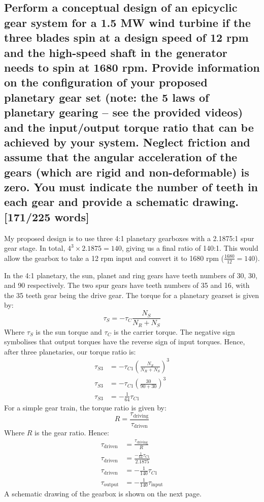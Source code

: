 \documentclass[12pt]{article}
\numberwithin{equation}{section}
\begin{document}
\begin{flushleft}
\subsection[Schematic.]{Perform a conceptual design of an epicyclic gear system for a 1.5 MW wind turbine if the three blades spin at a design speed of 12 rpm and the high-speed shaft in the generator needs to spin at 1680 rpm. Provide information on the configuration of your proposed planetary gear set (note: the 5 laws of planetary gearing – see the provided videos) and the input/output torque ratio that can be achieved by your system. Neglect friction and assume that the angular acceleration of the gears (which are rigid and non-deformable) is zero. You must indicate the number of teeth in each gear and provide a schematic drawing. [171/225 words]}
My proposed design is to use three 4:1 planetary gearboxes with a 2.1875:1 spur gear stage. In total, $4^3 \times 2.1875 = 140$, giving us a final ratio of 140:1. This would allow the gearbox to take a 12 rpm input and convert it to 1680 rpm ($\frac{1680}{12} = 140$).

In the 4:1 planetary, the sun, planet and ring gears have teeth numbers of 30, 30, and 90 respectively. The two spur gears have teeth numbers of 35 and 16, with the 35 teeth gear being the drive gear. The torque for a planetary gearset is given by:
\begin{equation}
  \tau_S = - \tau_C \frac{N_S}{N_R + N_S}
\end{equation}
Where $\tau_S$ is the sun torque and $\tau_C$ is the carrier torque. The negative sign symbolises that output torques have the reverse sign of input torques.
Hence, after three planetaries, our torque ratio is:
\begin{align}
  \tau_{S3} &= - \tau_{C1} \left( \frac{N_S}{N_R + N_S} \right)^3\\
  \tau_{S3} &= - \tau_{C1} \left( \frac{30}{90 + 30} \right)^3\\
  \tau_{S3} &= - \frac{1}{64}\tau_{C1} 
\end{align}
For a simple gear train, the torque ratio is given by:
\begin{equation}
  R = \frac{\tau_{\textrm{driving}}}{\tau_{\textrm{driven}}}
\end{equation}
Where $R$ is the gear ratio. Hence:
\begin{align}
  \tau_{\textrm{driven}} &= \frac{\tau_{\textrm{driving}}}{R}\\
  \tau_{\textrm{driven}} &= \frac{- \frac{1}{64}\tau_{C1} }{2.1875}\\
  \tau_{\textrm{driven}} &= -\frac{1}{140} \tau_{C1}\\
  \tau_{\textrm{output}} &= -\frac{1}{140} \tau_{\textrm{input}}
\end{align}
A schematic drawing of the gearbox is shown on the next page.
\newpage
\setcounter{page}{11}

\end{flushleft}
\end{document}
